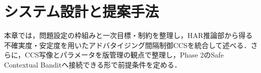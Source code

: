 ﻿%
\chapter{システム設計と提案手法}
\label{ch:system_method}
\clearpage

本章では，問題設定の枠組みと一次目標・制約を整理し，HAR推論部から得る不確実度・安定度を用いたアドバタイジング間隔制御CCSを統合して述べる．さらに，CCS写像とパラメータを版管理の観点で整理し，Phase 2のSafe Contextual Banditへ接続できる形で前提条件を定める．








